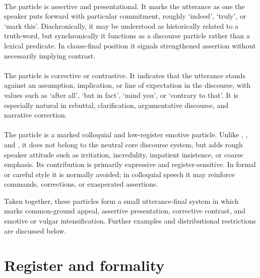\paragraph{} The particle  is assertive and presentational.
It marks the utterance as one the speaker puts forward with particular
commitment, roughly `indeed', `truly', or `mark this'. Diachronically, it may be
understood as historically related to a truth-word, but synchronically it
functions as a discourse particle rather than a lexical predicate. In
clause-final position it signals strengthened assertion without necessarily
implying contrast.

\paragraph{} The particle  is corrective or contrastive. It
indicates that the utterance stands against an assumption, implication, or line
of expectation in the discourse, with values such as `after all', `but in fact',
`mind you', or `contrary to that'. It is especially natural in rebuttal,
clarification, argumentative discourse, and narrative correction.

\paragraph{} The particle  is a marked colloquial and
low-register emotive particle. Unlike , , and , it
does not belong to the neutral core discourse system, but adds rough speaker
attitude such as irritation, incredulity, impatient insistence, or coarse
emphasis. Its contribution is primarily expressive and register-sensitive. In
formal or careful style it is normally avoided; in colloquial speech it may
reinforce commands, corrections, or exasperated assertions.

Taken together, these particles form a small utterance-final system in which
 marks common-ground appeal,  assertive presentation,
 corrective contrast, and  emotive or vulgar
intensification. Further examples and distributional restrictions are discussed
below.

%
%

\section{Register and formality}\label{sec:register}\label{sec:register-discourse}

